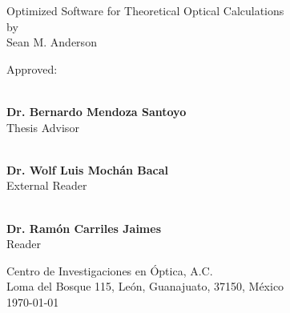 \begin{titlingpage}

\begin{center}
    \vspace*{1cm}
    {\LARGE Optimized Software for Theoretical Optical Calculations}\\
    \vspace{0.7cm}
    {\large by}\\
    \vspace{0.7cm}
    {\Large Sean M. Anderson}
\end{center}

\vfill
{\Large Approved:}

\begin{flushright}

\vspace*{1cm}

\makebox[0.5\textwidth ]{\hrulefill}\\
\textbf{Dr. Bernardo Mendoza Santoyo}\\ Thesis Advisor
\vspace{1.25cm}

\makebox[0.5\textwidth ]{\hrulefill}\\
\textbf{Dr. Wolf Luis Moch\'an Bacal}\\ External Reader
\vspace{1.25cm}

\makebox[0.5\textwidth ]{\hrulefill}\\
\textbf{Dr. Ram\'on Carriles Jaimes}\\ Reader
\vfill

\end{flushright}

\begin{center}
    {\large 
    Centro de Investigaciones en \'Optica, A.C.\\
    Loma del Bosque 115, Le\'on, Guanajuato, 37150, M\'exico\\
    \today
    }
\end{center}

\end{titlingpage}
